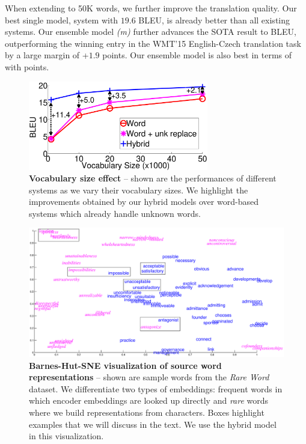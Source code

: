 When extending to 50K words, we further improve the translation quality.
Our best single model, system \model{} with $19.6$ BLEU, is already better than all
existing systems.
Our ensemble model {\it (m)} further advances the SOTA
result to \bi{\ensbleu} BLEU, outperforming
the winning entry in the WMT'15 English-Czech translation task by a large margin
of +$1.9$ points. Our ensemble model is also best in terms of \chr{} with  points.

\begin{figure}%
\centering
\includegraphics[width=0.7\textwidth, clip=true, trim= 0 0 0 0]{img/5-vocab}
\caption[Vocabulary size effect]{{\bf Vocabulary size effect} -- shown are the performances of different
systems as we vary their vocabulary sizes. We highlight the improvements obtained
by our hybrid models over word-based systems which already handle unknown words.}
\label{f:vocab}
\end{figure}


\begin{figure}%
\centering
\includegraphics[width=\textwidth, clip=true, trim= 100 50 0 20]{img/5-emb}
\caption[Barnes-Hut-SNE visualization of source word representations]{{\bf Barnes-Hut-SNE visualization of source word representations} --
shown are sample words from the {\it Rare Word} dataset. We differentiate two types of
embeddings: {\color{blue} frequent} words in which encoder embeddings are looked up directly and {\it {\color{magenta} rare}} words
where we build representations from characters. Boxes highlight examples that
we will discuss in the text. We use the hybrid model \model{} in this visualization.}
\label{f:visual}
\end{figure}


